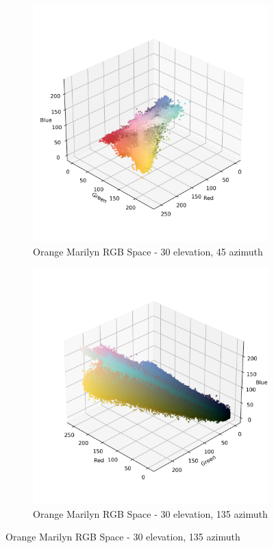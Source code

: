 \documentclass{article}
\begin{document}
\begin{figure}[ht]
  \centering
  \begin{subfigure}{0.45\textwidth}
    \includegraphics[width=\textwidth]{main_files/figure-latex/4_1_orange_marilyn_original_scatter.jpg}
    \caption{Orange Marilyn RGB Space - 30 \degree elevation, 45 \degree azimuth}
    \label{fig:4_1_orange_marilyn_original_scatter}
  \end{subfigure}
  \hfill
  \begin{subfigure}{0.45\textwidth}
    \includegraphics[width=\textwidth]{main_files/figure-latex/4_2_orange_marilyn_original_scatter.jpg}
    \caption{Orange Marilyn RGB Space - 30 \degree elevation, 135 \degree azimuth}
    \label{fig:4_2_orange_marilyn_original_scatter}
  \end{subfigure}
  \label{fig:orange_marilyn_original_scatter_1}
\end{figure}
\end{document}
